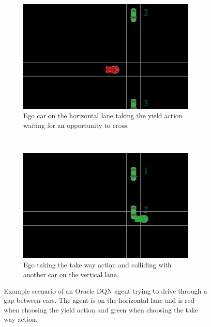 \begin{figure}[h]
	\centering
	\begin{subfigure}[t]{0.48\columnwidth}
		\centering
		\includegraphics[width=0.99\textwidth]{figures/dqn collision example/dqn collision_1.jpeg}
		\caption{Ego car on the horizontal lane taking the yield action waiting for an opportunity to cross.}
\end{subfigure}%
	~ 
	\begin{subfigure}[t]{0.48\columnwidth}
		\centering
		\includegraphics[width=0.99\textwidth]{figures/dqn collision example/dqn collision_3.jpeg}
		\caption{Ego taking the take way action and colliding with another car on the vertical lane.}
	\end{subfigure}

	\caption{Example scenario of an Oracle DQN agent trying to drive through a gap between cars. The agent is on the horizontal lane and is red when choosing the yield action and green when choosing the take way action.}
	\label{fig:dqn_collision}
\end{figure}
